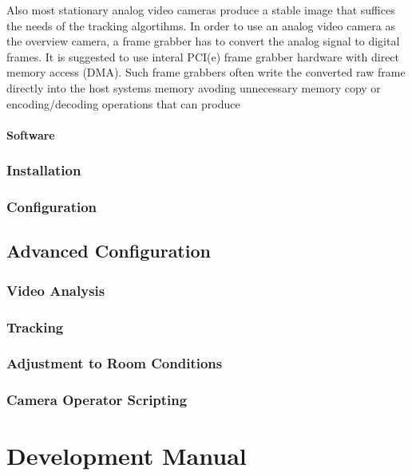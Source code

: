 \documentclass[a4paper,10pt]{book}
\begin{document}
Also most stationary analog video cameras produce a stable image that suffices the needs of the tracking algortihms. In order to use an analog video camera as the overview camera, a frame grabber has to convert the analog signal to digital frames. It is suggested to use interal PCI(e) frame grabber hardware with direct memory access (DMA). Such frame grabbers often write the converted raw frame directly into the host systems memory avoding unnecessary memory copy or encoding/decoding operations that can produce 

\subsubsection{Software}

\subsection{Installation}

\subsection{Configuration}

\section{Advanced Configuration}

\subsection{Video Analysis}

\subsection{Tracking}

\subsection{Adjustment to Room Conditions}

\subsection{Camera Operator Scripting}

\chapter{Development Manual}
\end{document}
